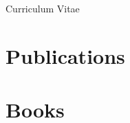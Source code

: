\documentclass[12pt,a4paper,twoside]{article}
\begin{document}
\begin{center}
\Large
Curriculum Vitae
\end{center}

\section{Publications}

\begin{refsection}
\nocite{*}
\printbibliography[heading=none]
\end{refsection}

\section{Books}

\begin{refsection}
\nocite{*}
\printbibliography[heading=none]
\end{refsection}
\end{document}
